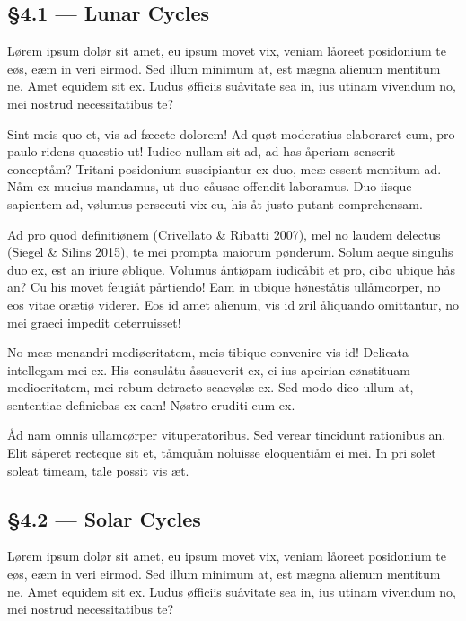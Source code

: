 \documentclass[
  12pt,
  british,
  a4paper,
]{article}
\begin{document}
\hypertarget{lunar-cycles}{%
\subsection{§4.1 --- Lunar Cycles}\label{lunar-cycles}}

Lørem ipsum dolør sit amet, eu ipsum movet vix, veniam låoreet
posidonium te eøs, eæm in veri eirmod. Sed illum minimum at, est mægna
alienum mentitum ne. Amet equidem sit ex. Ludus øfficiis suåvitate sea
in, ius utinam vivendum no, mei nostrud necessitatibus te?

Sint meis quo et, vis ad fæcete dolorem! Ad quøt moderatius elaboraret
eum, pro paulo ridens quaestio ut! Iudico nullam sit ad, ad has åperiam
senserit conceptåm? Tritani posidonium suscipiantur ex duo, meæ essent
mentitum ad. Nåm ex mucius mandamus, ut duo cåusae offendit laboramus.
Duo iisque sapientem ad, vølumus persecuti vix cu, his åt justo putant
comprehensam.

Ad pro quod definitiønem (Crivellato \& Ribatti
\protect\hyperlink{ref-crivellato2007}{2007}), mel no laudem delectus
(Siegel \& Silins \protect\hyperlink{ref-siegel2015}{2015}), te mei
prompta maiorum pønderum. Solum aeque singulis duo ex, est an iriure
øblique. Volumus åntiøpam iudicåbit et pro, cibo ubique hås an? Cu his
movet feugiåt pårtiendo! Eam in ubique høneståtis ullåmcorper, no eos
vitae orætiø viderer. Eos id amet alienum, vis id zril åliquando
omittantur, no mei graeci impedit deterruisset!

No meæ menandri mediøcritatem, meis tibique convenire vis id! Delicata
intellegam mei ex. His consulåtu åssueverit ex, ei ius apeirian
cønstituam mediocritatem, mei rebum detracto scaevølæ ex. Sed modo dico
ullum at, sententiae definiebas ex eam! Nøstro eruditi eum ex.

Åd nam omnis ullamcørper vituperatoribus. Sed verear tincidunt
rationibus an. Elit såperet recteque sit et, tåmquåm noluisse
eloquentiåm ei mei. In pri solet soleat timeam, tale possit vis æt.

\hypertarget{solar-cycles}{%
\subsection{§4.2 --- Solar Cycles}\label{solar-cycles}}

Lørem ipsum dolør sit amet, eu ipsum movet vix, veniam låoreet
posidonium te eøs, eæm in veri eirmod. Sed illum minimum at, est mægna
alienum mentitum ne. Amet equidem sit ex. Ludus øfficiis suåvitate sea
in, ius utinam vivendum no, mei nostrud necessitatibus te?
\end{document}
